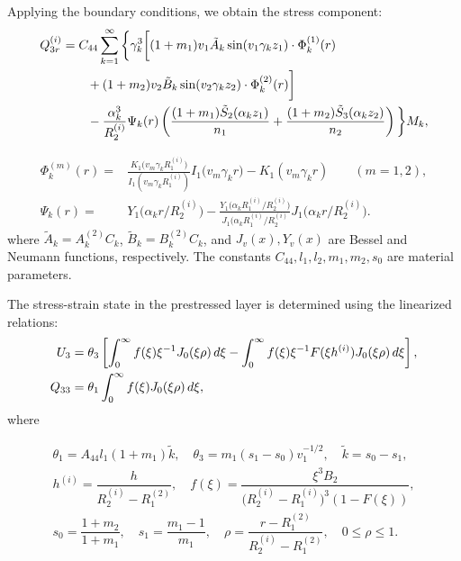 Applying the boundary conditions, we obtain the stress component:
\begin{align}
	Q_{3r}^{(i)} &= C_{44} \sum_{k=1}^\infty \bigg\{ 
	\gamma_k^3 \bigg[
	(1 + m_1) v_1 \tilde{A}_k \sin(v_1 \gamma_k z_1) \cdot \Phi_k^{(1)}(r) \notag \\
	&\qquad + (1 + m_2) v_2 \tilde{B}_k \sin(v_2 \gamma_k z_2) \cdot \Phi_k^{(2)}(r)
	\bigg] \notag \\
	&\qquad - \frac{\alpha_k^3}{R_2^{(i)}} \Psi_k(r) 
	\left( \frac{(1 + m_1) \tilde{S}_2(\alpha_k z_1)}{n_1} 
	+ \frac{(1 + m_2) \tilde{S}_3(\alpha_k z_2)}{n_2} \right)
	\bigg\} M_k, \label{YaretskaEq4.2.1}
\end{align}

\begin{align*}
	\Phi_k^{(m)}(r) =& 
	\frac{K_1\big(v_m \gamma_k R_1^{(i)}\big)}{I_1(v_m \gamma_k R_1^{(i)})} 
	I_1\big(v_m \gamma_k r\big) - K_1(v_m \gamma_k r)
	\qquad (m = 1, 2), \\
	\Psi_k(r) = &
	Y_1\big( \alpha_k r / R_2^{(i)} \big)
	- \frac{ Y_1\big( \alpha_k R_1^{(i)} / R_2^{(i)} \big)}
	{J_1\big( \alpha_k R_1^{(i)} / R_2^{(i)}} 
	J_1\big( \alpha_k r / R_2^{(i)} \big).
\end{align*}
where \( \tilde{A}_k = A_k^{(2)} C_k \), \( \tilde{B}_k = B_k^{(2)} C_k \), and \( J_v(x), Y_v(x) \) are Bessel and Neumann functions, respectively. The constants \( C_{44}, l_1, l_2, m_1, m_2, s_0 \) are material parameters.

The stress-strain state in the prestressed layer is determined using the linearized relations:
\begin{align}
	U_3 &= \theta_3 \left[
	\int_0^\infty f(\xi) \xi^{-1} J_0(\xi \rho) \, d\xi 
	- \int_0^\infty f(\xi) \xi^{-1} F(\xi h^{(i)}) J_0(\xi \rho) \, d\xi
	\right], \notag \\
	Q_{33} &= \theta_1 \int_0^\infty f(\xi) J_0(\xi \rho) \, d\xi, \label{YaretskaEq4.2.2}
\end{align}
where

\begin{equation*} \label{YaretskaEqConstants}
	\begin{array}{c}
		\theta_1 = A_{44} l_1 (1 + m_1) \tilde{k},\quad 
		\theta_3 = m_1 (s_1 - s_0) v_1^{-1/2},\quad  
		\tilde{k} = s_0 - s_1, \\
		h^{(i)} = \dfrac{h}{R_2^{(i)} - R_1^{(2)}},\quad  
	    f(\xi) = \dfrac{\xi^3 B_2}{\big(R_2^{(i)} - R_1^{(i)}\big)^3 (1 - F(\xi))}, \\
		s_0 = \dfrac{1 + m_2}{1 + m_1},\quad
	    s_1 = \dfrac{m_1 - 1}{m_1},\quad 
	    \rho = \dfrac{r - R_1^{(2)}}{R_2^{(i)} - R_1^{(2)}}, \quad 0 \le \rho \le 1.
	\end{array}
\end{equation*}


